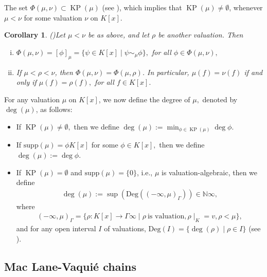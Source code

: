\documentclass[11pt]{amsart}
\newtheorem{corollary}[theorem]{Corollary}
\theoremstyle{definition}
\theoremstyle{remark}
\numberwithin{equation}{section}
\begin{document}
 
 The set $\Phi(\mu,\nu)\subset \operatorname{KP}(\mu)$ (see \cite[Theorem 1.15]{V}), which implies that $\operatorname{KP}(\mu)\neq\emptyset$, whenever $\mu<\nu$ for some valuation $\nu$ on $K[x].$
 
 \begin{corollary}(\cite[Corollary 2.5]{EN1})\label{2.5}
 	Let $\mu<\nu$ be as above, and let $\rho$ be another valuation. Then
 	\begin{enumerate}[(i)]
 		\item $\Phi(\mu,\nu)=[\phi]_\mu=\{\psi\in K[x]\mid \psi\sim_{\mu}\phi\},$ for all $\phi\in\Phi(\mu,\nu),$
 		\item If $\mu<\rho<\nu$, then $\Phi(\mu,\nu)=\Phi(\mu,\rho)$.  In particular, $\mu(f)=\nu(f)$ if and only if $\mu(f)=\rho(f),$ for all $f\in K[x].$
 	\end{enumerate}
 \end{corollary}
 
 For any valuation $\mu$ on $K[x]$, we now define the degree of $\mu,$ denoted by $\deg(\mu)$, as follows:
 \begin{itemize}
 	\item If $\operatorname{KP}(\mu)\neq\emptyset,$ then we define $\deg (\mu):=\min_{\phi\in\operatorname{KP}(\mu)}\deg \phi.$
 	\item  If $\text{supp}(\mu)=\phi K[x]$ for some $\phi\in K[x],$ then we define $\deg (\mu):=\deg\phi.$
 	\item  If $\operatorname{KP}(\mu)=\emptyset$ and $\text{supp}(\mu)=\{0\}$, i.e., $\mu$ is valuation-algebraic, then we define
 	\begin{align*}
 		\deg(\mu):=\sup(\text{Deg}((-\infty,\mu)_{\Gamma}))\in\mathbb{N}\infty,
 	\end{align*} where 
 	\begin{align}
 		(-\infty,\mu)_{\Gamma}=\{\rho:K[x]\longrightarrow \Gamma\infty\mid \rho\ \text{is valuation},\rho\mid_K=v,\rho<\mu\},
 	\end{align} and for any open interval $I$ of valuations, $\text{Deg}(I)=\{\deg(\rho)\mid  \rho\in I\}$ (see \cite[Section 2C]{EN1}). 
 	\end{itemize} 
 

\subsection{Mac Lane-Vaqui\'e chains}
\end{document}
